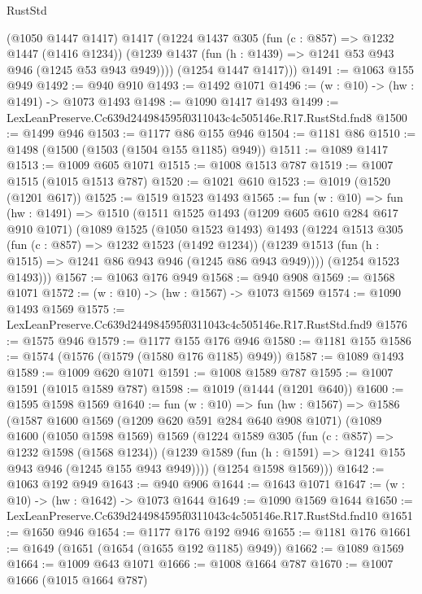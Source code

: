 \begin{lexlean}{RustStd}
\begin{coremodule}
        (@1050 @1447 @1417)
        @1417
        (@1224
          @1437
          @305
          (fun (c : @857) => @1232 @1447 (@1416 @1234))
          (@1239 @1437 (fun (h : @1439) => @1241 @53 @943 @946 (@1245 @53 @943 @949))))
        (@1254 @1447 @1417)))
@1491 := @1063 @155 @949
@1492 := @940 @910
@1493 := @1492 @1071
@1496 := (w : @10) -> (hw : @1491) -> @1073 @1493
@1498 := @1090 @1417 @1493
@1499 := LexLeanPreserve.Cc639d244984595f0311043c4c505146e.R17.RustStd.fnd8
@1500 := @1499 @946
@1503 := @1177 @86 @155 @946
@1504 := @1181 @86
@1510 := @1498 (@1500 (@1503 (@1504 @155 @1185) @949))
@1511 := @1089 @1417
@1513 := @1009 @605 @1071
@1515 := @1008 @1513 @787
@1519 := @1007 @1515 (@1015 @1513 @787)
@1520 := @1021 @610
@1523 := @1019 (@1520 (@1201 @617))
@1525 := @1519 @1523 @1493
@1565 := fun (w : @10) =>
  fun (hw : @1491) =>
  @1510
    (@1511
      @1525
      @1493
      (@1209 @605 @610 @284 @617 @910 @1071)
      (@1089
        @1525
        (@1050 @1523 @1493)
        @1493
        (@1224
          @1513
          @305
          (fun (c : @857) => @1232 @1523 (@1492 @1234))
          (@1239 @1513 (fun (h : @1515) => @1241 @86 @943 @946 (@1245 @86 @943 @949))))
        (@1254 @1523 @1493)))
@1567 := @1063 @176 @949
@1568 := @940 @908
@1569 := @1568 @1071
@1572 := (w : @10) -> (hw : @1567) -> @1073 @1569
@1574 := @1090 @1493 @1569
@1575 := LexLeanPreserve.Cc639d244984595f0311043c4c505146e.R17.RustStd.fnd9
@1576 := @1575 @946
@1579 := @1177 @155 @176 @946
@1580 := @1181 @155
@1586 := @1574 (@1576 (@1579 (@1580 @176 @1185) @949))
@1587 := @1089 @1493
@1589 := @1009 @620 @1071
@1591 := @1008 @1589 @787
@1595 := @1007 @1591 (@1015 @1589 @787)
@1598 := @1019 (@1444 (@1201 @640))
@1600 := @1595 @1598 @1569
@1640 := fun (w : @10) =>
  fun (hw : @1567) =>
  @1586
    (@1587
      @1600
      @1569
      (@1209 @620 @591 @284 @640 @908 @1071)
      (@1089
        @1600
        (@1050 @1598 @1569)
        @1569
        (@1224
          @1589
          @305
          (fun (c : @857) => @1232 @1598 (@1568 @1234))
          (@1239 @1589 (fun (h : @1591) => @1241 @155 @943 @946 (@1245 @155 @943 @949))))
        (@1254 @1598 @1569)))
@1642 := @1063 @192 @949
@1643 := @940 @906
@1644 := @1643 @1071
@1647 := (w : @10) -> (hw : @1642) -> @1073 @1644
@1649 := @1090 @1569 @1644
@1650 := LexLeanPreserve.Cc639d244984595f0311043c4c505146e.R17.RustStd.fnd10
@1651 := @1650 @946
@1654 := @1177 @176 @192 @946
@1655 := @1181 @176
@1661 := @1649 (@1651 (@1654 (@1655 @192 @1185) @949))
@1662 := @1089 @1569
@1664 := @1009 @643 @1071
@1666 := @1008 @1664 @787
@1670 := @1007 @1666 (@1015 @1664 @787)

\end{coremodule}
\end{lexlean}

